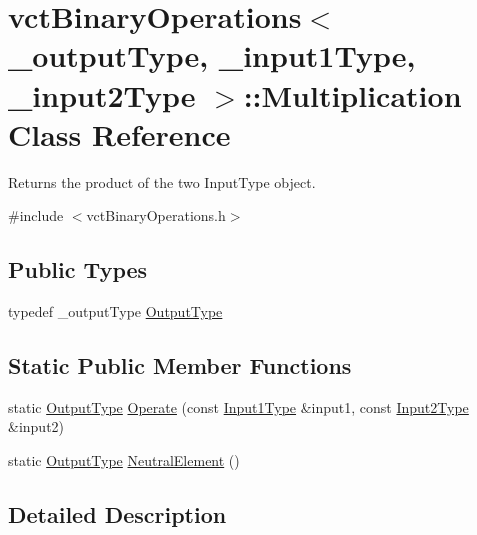\hypertarget{classvct_binary_operations_1_1_multiplication}{\section{vct\-Binary\-Operations$<$ \-\_\-output\-Type, \-\_\-input1\-Type, \-\_\-input2\-Type $>$\-:\-:Multiplication Class Reference}
\label{classvct_binary_operations_1_1_multiplication}
}


Returns the product of the two Input\-Type object.  




{\ttfamily \#include $<$vct\-Binary\-Operations.\-h$>$}

\subsection*{Public Types}
\begin{DoxyCompactItemize}
\item 
typedef \-\_\-output\-Type \hyperlink{classvct_binary_operations_1_1_multiplication_a54b8e0ebb628e865d7d5221b2b8dc898}{Output\-Type}
\end{DoxyCompactItemize}
\subsection*{Static Public Member Functions}
\begin{DoxyCompactItemize}
\item 
static \hyperlink{classvct_binary_operations_1_1_multiplication_a54b8e0ebb628e865d7d5221b2b8dc898}{Output\-Type} \hyperlink{classvct_binary_operations_1_1_multiplication_a3ff7bb9dae1d65837456aa494a72a516}{Operate} (const \hyperlink{classvct_binary_operations_a5e56a66a012d6a28c539a08a0021c45e}{Input1\-Type} \&input1, const \hyperlink{classvct_binary_operations_a929119af557a04a16b4d854981e49e1b}{Input2\-Type} \&input2)
\item 
static \hyperlink{classvct_binary_operations_1_1_multiplication_a54b8e0ebb628e865d7d5221b2b8dc898}{Output\-Type} \hyperlink{classvct_binary_operations_1_1_multiplication_abcfcc667a31972270bd3fcbc7b08046e}{Neutral\-Element} ()
\end{DoxyCompactItemize}


\subsection{Detailed Description}
